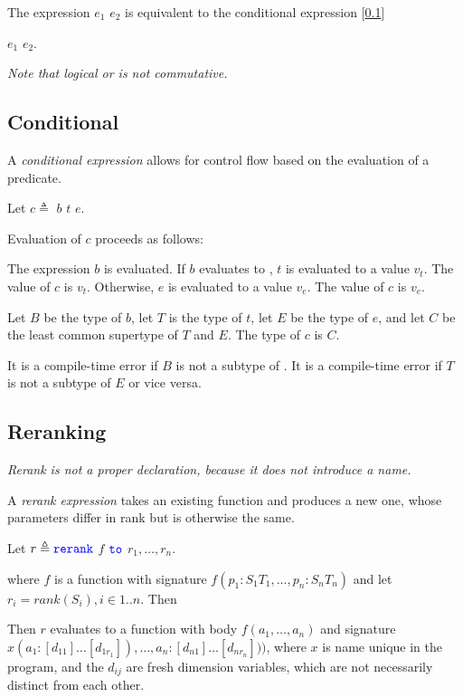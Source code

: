 \documentclass{article}
\begin{document}
{\OrExpression{}

The expression $e_1$ \OR{} $e_2$ is equivalent to the conditional expression [\ref{conditional}] 

\IF{} $e_1$ \THEN{} \TRUE{} \ELSE{} $e_2$.

{\em
Note that logical or is not commutative.
}


\subsection{Conditional}
\label{conditional}

A {\em conditional expression} allows for control flow based on the evaluation of a predicate.

\ConditionalExpression{}

Let $c \triangleq $ \IF{} $b$ \THEN{} $t$ \ELSE{} $e$.

Evaluation of $c$ proceeds as follows:

The expression $b$ is evaluated. 
If $b$ evaluates to \TRUE{}, $t$ is evaluated to a value $v_t$. The value of $c$ is $v_t$. Otherwise, $e$ is evaluated to a value $v_e$. The value of $c$ is $v_e$.

Let $B$ be the type of $b$, let $T$ is the type of $t$, let $E$ be the type of $e$, and let $C$ be the least common supertype of $T$ and $E$. The type of $c$ is $C$. 

It is a compile-time error if $B$ is not a subtype of \BOOL{}. It is a compile-time error if $T$ is not a subtype of $E$ or vice versa. 

\subsection{Reranking}
\label{reranking}

{\em
Rerank is not a proper declaration, because it does not introduce a name. 
}

A {\em rerank expression} takes an existing function and produces a new one, whose parameters differ in rank but is otherwise the same.

\RerankExpression

Let $r \triangleq  \texttt{\color{blue} rerank}{}$ $f$  $\texttt{\color{blue} to}{}$ $r_1, \ldots, r_n$.

where $f$ is a function with signature $f(p_1: S_1 T_1, \ldots, p_n: S_n T_n)$ and let $r_i = rank(S_i), i \in 1..n$. Then

Then $r$ evaluates to a function with body $f(a_1, \ldots, a_n)$ and signature 
$x(a_1: [d_{11}]\ldots [d_{1{r_1}}]), \ldots, a_n: [d_{n1}]\ldots [d_{n{r_n}}]))$, where $x$ is name unique in the program, and the $d_{ij}$ are fresh dimension variables, which are not necessarily distinct from each other.

}
\end{document}
